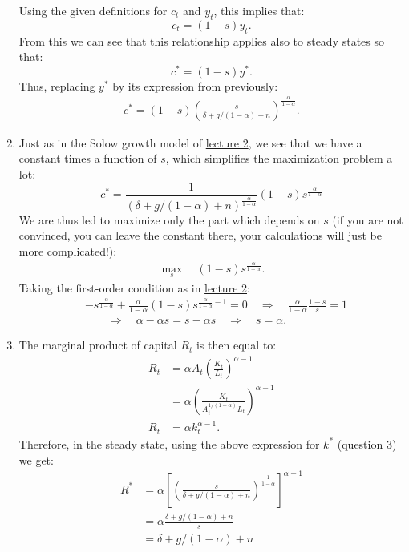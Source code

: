 \documentclass[]{book}
\theoremstyle{definition}
\theoremstyle{definition}
\theoremstyle{definition}
\theoremstyle{remark}
\begin{document}
\begin{enumerate}
  Using the given definitions for \(c_t\) and \(y_t\), this implies
  that: \[c_t = (1-s)y_t.\] From this we can see that this relationship
  applies also to steady states so that: \[c^{*} = (1-s)y^{*}.\] Thus,
  replacing \(y^{*}\) by its expression from previously: \[
  \begin{aligned}
  \boxed{c^{*}=(1-s)\left(\frac{s}{\delta+g/(1-\alpha)+n}\right)^{\frac{\alpha}{1-\alpha}}}.
  \end{aligned}
  \]
\item
  Just as in the Solow growth model of \protect\hyperlink{solow}{lecture
  2}, we see that we have a constant times a function of \(s\), which
  simplifies the maximization problem a lot:
  \[c^{*}=\frac{1}{\left(\delta+g/(1-\alpha)+n\right)^{\frac{\alpha}{1-\alpha}}} (1-s)s^{\frac{\alpha}{1-\alpha}}\]
  We are thus led to maximize only the part which depends on \(s\) (if
  you are not convinced, you can leave the constant there, your
  calculations will just be more complicated!): \[
  \begin{aligned}
  \max_s \quad  (1-s)s^{\frac{\alpha}{1-\alpha}}.
  \end{aligned}
  \] Taking the first-order condition as in
  \protect\hyperlink{solow}{lecture 2}: \[
  \begin{aligned}
  &-s^{\frac{\alpha}{1-\alpha}}+\frac{\alpha}{1-\alpha}(1-s)s^{\frac{\alpha}{1-\alpha}-1} =0 \quad \Rightarrow\quad\frac{\alpha}{1-\alpha}\frac{1-s}{s}=1\\
  &\quad \quad \Rightarrow\quad\alpha-\alpha s=s-\alpha s \quad\Rightarrow\quad\boxed{s=\alpha}.
  \end{aligned}
  \]
\item
  The marginal product of capital \(R_t\) is then equal to: \[
  \begin{aligned}
  R_t&=\alpha A_t \left(\frac{K_t}{L_t}\right)^{\alpha-1}\\
  &=\alpha \left(\frac{K_t}{A_t^{1/(1-\alpha)} L_t}\right)^{\alpha-1}\\
  R_t&=\alpha k_t^{\alpha-1}.
  \end{aligned}
  \] Therefore, in the steady state, using the above expression for
  \(k^{*}\) (question 3) we get: \[
  \begin{aligned}
  R^{*}&=\alpha \left[\left(\frac{s}{\delta + g/(1-\alpha)+n}\right)^{\frac{1}{1-\alpha}}\right]^{\alpha-1}\\
  &=\alpha \frac{\delta + g/(1-\alpha)+n}{s}\\
  &=\delta + g/(1-\alpha)+n\\

\end{aligned}\]
\end{enumerate}
\end{document}
